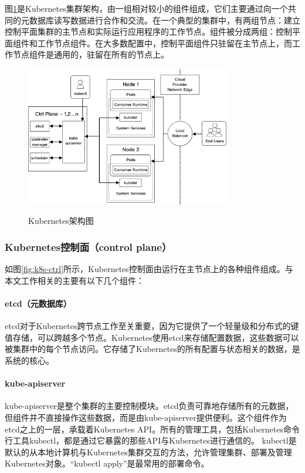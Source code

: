 \documentclass[macfonts,master]{njuthesis}
\begin{document}
图\ref{fig:k8s-arch}是Kubernetes集群架构，由一组相对较小的组件组成，它们主要通过向一个共同的元数据库读写数据进行合作和交流。在一个典型的集群中，有两组节点：建立控制平面集群的主节点和实际运行应用程序的工作节点。组件被分成两组：控制平面组件和工作节点组件。在大多数配置中，控制平面组件只驻留在主节点上，而工作节点组件是通用的，驻留在所有的节点上\cite{k8scomponents}。

\begin{figure}[htbp]
  \centering
  \includegraphics[width=0.8\textwidth]{pics/Kubernetes-architecture.pdf}\\
  \caption{Kubernetes架构图}\label{fig:k8s-arch}
\end{figure}

\subsubsection{Kubernetes控制面（control plane）}
如图\ref{fig:k8s-ctrl}所示，Kubernetes控制面由运行在主节点上的各种组件组成。与本文工作相关的主要有以下几个组件：

\paragraph{etcd（元数据库）}

etcd对于Kubernetes跨节点工作至关重要，因为它提供了一个轻量级和分布式的键值存储，可以跨越多个节点。Kubernetes使用etcd来存储配置数据，这些数据可以被集群中的每个节点访问。它存储了Kubernetes的所有配置与状态相关的数据，是系统的核心。

\paragraph{kube-apiserver}
kube-apiserver是整个集群的主要控制模块。etcd负责可靠地存储所有的元数据，但组件并不直接操作这些数据，而是由kube-apiserver提供便利。这个组件作为etcd之上的一层，承载着Kubernetes API。所有的管理工具，包括Kubernetes命令行工具kubectl，都是通过它暴露的那些API与Kubernetes进行通信的。 kubectl是默认的从本地计算机与Kubernetes集群交互的方法，允许管理集群、部署及管理Kubernetes对象。``kubectl apply''是最常用的部署命令。
\end{document}
